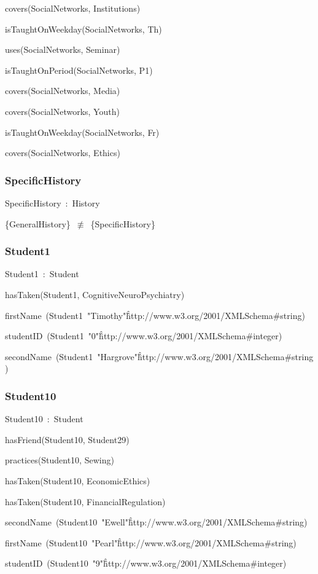 \documentclass{article}
\begin{document}
covers(SocialNetworks, Institutions)

isTaughtOnWeekday(SocialNetworks, Th)

uses(SocialNetworks, Seminar)

isTaughtOnPeriod(SocialNetworks, P1)

covers(SocialNetworks, Media)

covers(SocialNetworks, Youth)

isTaughtOnWeekday(SocialNetworks, Fr)

covers(SocialNetworks, Ethics)

\subsubsection*{SpecificHistory}

SpecificHistory~:~History

\{GeneralHistory\}~\ensuremath{\not\equiv}~\{SpecificHistory\}

\subsubsection*{Student1}

Student1~:~Student

hasTaken(Student1, CognitiveNeuroPsychiatry)

firstName~(Student1~"Timothy"\^\^http://www.w3.org/2001/XMLSchema#string)

studentID~(Student1~"0"\^\^http://www.w3.org/2001/XMLSchema#integer)

secondName~(Student1~"Hargrove"\^\^http://www.w3.org/2001/XMLSchema#string)

\subsubsection*{Student10}

Student10~:~Student

hasFriend(Student10, Student29)

practices(Student10, Sewing)

hasTaken(Student10, EconomicEthics)

hasTaken(Student10, FinancialRegulation)

secondName~(Student10~"Ewell"\^\^http://www.w3.org/2001/XMLSchema#string)

firstName~(Student10~"Pearl"\^\^http://www.w3.org/2001/XMLSchema#string)

studentID~(Student10~"9"\^\^http://www.w3.org/2001/XMLSchema#integer)
\end{document}

